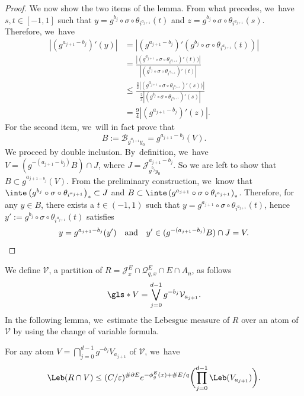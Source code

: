 \begin{proof}
We now show the two items of the lemma.
From what precedes, we~have $s,t \in [-1, 1]$ such that $y = g^{b_j} \circ \sigma \circ \theta_{i^{a_{j+1}}}(t)$ and $z = g^{b_j} \circ \sigma \circ \theta_{i^{a_{j+1}}}(s)$.
Therefore, we~have
\begin{align*}
|(g^{a_{j+1} - b_j})'(y)| &= |(g^{a_{j+1} - b_j})' \left (g^{b_j} \circ \sigma \circ \theta_{i^{a_{j+1}}}(t) \right)|\\
&= \frac{|(g^{a_{j+1}} \circ \sigma \circ \theta_{i^{a_{j+1}}})'(t))|}{|(g^{b_j} \circ \sigma \circ \theta_{i^{a_{j+1}}})'(t)|}\\
&\leq \frac{\frac{3}{2}|(g^{a_{j+1}} \circ \sigma \circ \theta_{i^{a_{j+1}}})'(s))|}{\frac{2}{3}|(g^{b_j} \circ \sigma \circ \theta_{i^{a_{j+1}}})'(s)|}\\
&= \frac{9}{4} |(g^{a_{j+1} - b_j})'(z)|.
\end{align*}
For the second item, we~will in fact prove that
\[
B := \mathcal{B}_{g^{a_{j+1}} y_0} = g^{a_{j+1} - b_j}(V).
\]
We proceed by double inclusion. By~definition, we~have $V = (g^{-(a_{j+1} - b_j)} B) \cap J$, where $J = \mathcal{J}_{g^{b_j}y_0}^{a_{j+1} - b_j}$.
So we are left to show that $B \subset g^{a_{j+1 - b_j}}(V)$.
From the preliminary construction, we~know that $\inte \left (g^{b_j} \circ \sigma \circ \theta_{i^{a_{j+1}}}\right)_* \subset J$ and $B \subset\inte \left (g^{a_{j+1}} \circ \sigma \circ \theta_{i^{a_{j+1}}}\right)_*$.
Therefore, for any $y \in B$, there exists a $t \in (-1, 1)$ such that $y=g^{a_{j+1}} \circ \sigma \circ \theta_{i^{a_{j+1}}}(t)$, hence $y' := g^{b_j} \circ \sigma \circ \theta_{i^{a_{j+1}}}(t)$ satisfies
\[
y = g^{a_{j+1}-b_j}(y') \quad \text{and} \quad y' \in (g^{-(a_{j+1} - b_j)} B) \cap J = V.
\qedhere
\]
\end{proof}

We define $\mathcal{V}$, a partition of $R = \mathcal{J}^E_x \cap \mathcal{Q}_{q,x}^{E} \cap E \cap A_n$, as follows
\[
\gls*{V} = \bigvee_{j=0}^{d-1} g^{-b_j}\mathcal{V}_{a_{j+1}}.
\]
In the following lemma, we~estimate the Lebesgue measure of $R$ over an atom of $\mathcal{V}$ by using the change of variable formula.

\begin{lem}
\label{lem:leb-atome}
For any atom $V = \bigcap_{j = 0}^{d-1} g^{-b_j} V_{a_{j+1}}$ of $\mathcal{V}$, we~have
\[
\Leb(R \cap V) \leq (C / \varepsilon)^{\# \partial E} e^{- \phi_g^E(x) + \# E / q} \biggl (\prod_{j = 0}^{d-1} \Leb(V_{a_{j+1}}) \biggr).
\]
\end{lem}

